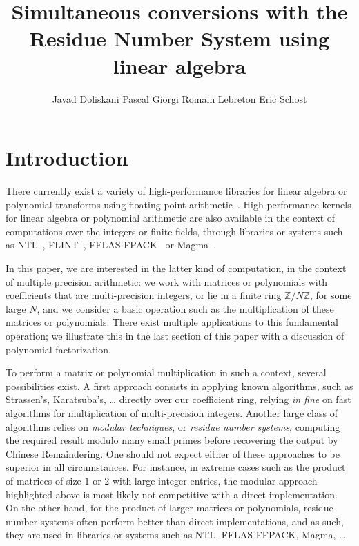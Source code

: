 \documentclass[acmtoms]{acmsmall}
\title{
Simultaneous conversions with the Residue Number System using linear algebra
}
\author{
Javad Doliskani \affil{University of Waterloo}
Pascal Giorgi \affil{LIRMM CNRS - University of Montpellier}
Romain Lebreton \affil{LIRMM CNRS - University of Montpellier}
Eric Schost \affil{University of Waterloo}
}
\def\Z{\mathbb{Z}}
\begin{document}
            
            
\maketitle


\section{Introduction}

There currently exist a variety of high-performance libraries for linear algebra or polynomial
transforms using floating point arithmetic~\cite{Whaley2001,Goto2008,FFTW05,Pueschel:05}.
High-performance kernels for linear algebra or polynomial arithmetic are also available in the
context of computations over the integers or finite fields, through libraries or systems such as
NTL~\cite{Shoup95}, FLINT~\cite{Hart2010}, FFLAS-FPACK~\cite{fflas-ffpack} or Magma~\cite{BoCaPl97}.

In this paper, we are interested in the latter kind of computation, in the context of multiple
precision arithmetic: we work with matrices or polynomials with coefficients that are
multi-precision integers, or lie in a finite ring $\Z/N\Z$, for some large $N$, and we consider a
basic operation such as the multiplication of these matrices or polynomials. There exist multiple
applications to this fundamental operation; we illustrate this in the last section of this paper
with a discussion of polynomial factorization.

To perform a matrix or polynomial multiplication in such a context, several possibilities exist. A
first approach consists in applying known algorithms, such as Strassen's, Karatsuba's, \dots
directly over our coefficient ring, relying {\it in fine} on fast algorithms for multiplication of
multi-precision integers. Another large class of algorithms relies on {\em modular techniques}, or
{\em residue number systems}, computing the required result modulo many small primes before
recovering the output by Chinese Remaindering.  One should not expect either of these approaches to
be superior in all circumstances. For instance, in extreme cases such as the product of matrices of
size $1$ or $2$ with large integer entries, the modular approach highlighted above is most likely
not competitive with a direct implementation. On the other hand, for the product of larger matrices
or polynomials, residue number systems often perform better than direct implementations, and as
such, they are used in libraries or systems such as NTL, FFLAS-FFPACK, Magma, \dots
\end{document}
